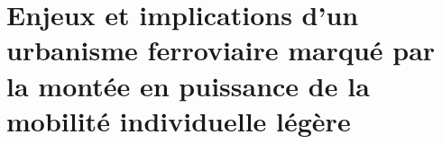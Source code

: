 
\chapter
{Enjeux et implications d’un urbanisme ferroviaire marqué par la montée en puissance de la mobilité individuelle légère
    \label{chap1:titre}
    }
    \begin{refsegment}



\end{refsegment}
